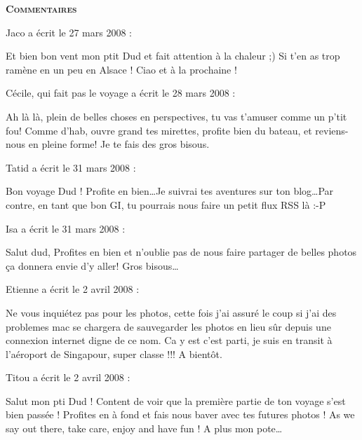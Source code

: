 \bigskip
\textbf{\textsc{Commentaires}}

\medskip
Jaco a écrit le 27 mars 2008 :
\begin{displayquote}
Et bien bon vent mon ptit Dud et fait attention à la chaleur ;) Si t'en as trop ramène en un peu en Alsace !
Ciao et à la prochaine !
\end{displayquote}

\medskip
Cécile, qui fait pas le voyage a écrit le 28 mars 2008 :
\begin{displayquote}
Ah là là, plein de belles choses en perspectives, tu vas t'amuser comme un p'tit fou! Comme d'hab, ouvre grand tes mirettes, profite bien du bateau, et reviens-nous en pleine forme!
Je te fais des gros bisous.
\end{displayquote}

\medskip
Tatid a écrit le 31 mars 2008 :
\begin{displayquote}
Bon voyage Dud ! Profite en bien\dots Je suivrai tes aventures sur ton blog\dots Par contre, en tant que bon GI, tu pourrais nous faire un petit flux RSS là :-P
\end{displayquote}

\medskip
Isa a écrit le 31 mars 2008 :
\begin{displayquote}
Salut dud,
Profites en bien et n'oublie pas de nous faire partager de belles photos ça donnera envie d'y aller!
Gros bisous\dots
\end{displayquote}

\medskip
Etienne a écrit le 2 avril 2008 :
\begin{displayquote}
Ne vous inquiétez pas pour les photos, cette fois j'ai assuré le coup si j'ai des problemes mac se chargera de sauvegarder les photos en lieu sûr depuis une connexion internet digne de ce nom.
Ca y est c'est parti, je suis en transit à l'aéroport de Singapour, super classe !!!
A bientôt.
\end{displayquote}

\medskip
Titou a écrit le 2 avril 2008 :
\begin{displayquote}
Salut mon pti Dud ! Content de voir que la première partie de ton voyage s'est bien passée ! Profites en à fond et fais nous baver avec tes futures photos !
As we say out there, take care, enjoy and have fun !
A plus mon pote\dots
\end{displayquote}

\vfill
